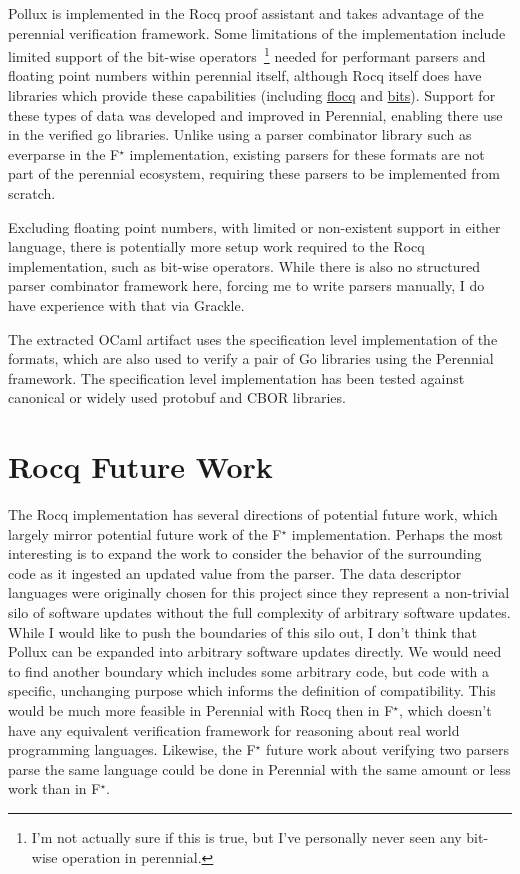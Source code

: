 \documentclass[11pt]{article}
\newcommand{\fstar}{F$^\star$}
\begin{document}
Pollux is implemented in the Rocq proof assistant and takes advantage of the
perennial verification framework. Some limitations of the implementation include
limited support of the bit-wise operators~\footnote{I'm not actually sure if
  this is true, but I've personally never seen any bit-wise operation in
  perennial.} needed for performant parsers and floating point numbers within
perennial itself, although Rocq itself does have libraries which provide these
capabilities (including \href{https://gitlab.inria.fr/flocq/flocq/}{flocq} and
\href{https://github.com/rocq-community/bits}{bits}). Support for these types of
data was developed and improved in Perennial, enabling there use in the verified
go libraries. Unlike using a parser combinator library such as everparse in the
\fstar{} implementation, existing parsers for these formats are not part of the
perennial ecosystem, requiring these parsers to be implemented from scratch. 

\begin{risk}
  Excluding floating point numbers, with limited or non-existent support in
  either language, there is potentially more setup work required to the Rocq
  implementation, such as bit-wise operators. While there is also no structured
  parser combinator framework here, forcing me to write parsers manually, I do
  have experience with that via Grackle.
\end{risk}

The extracted OCaml artifact uses the specification level implementation of the
formats, which are also used to verify a pair of Go libraries using the
Perennial framework. The specification level implementation has been tested
against canonical or widely used protobuf and CBOR libraries.

\section{Rocq Future Work}

The Rocq implementation has several directions of potential future work, which
largely mirror potential future work of the \fstar{} implementation. Perhaps the
most interesting is to expand the work to consider the behavior of the
surrounding code as it ingested an updated value from the parser. The data
descriptor languages were originally chosen for this project since they
represent a non-trivial silo of software updates without the full complexity of
arbitrary software updates. While I would like to push the boundaries of this
silo out, I don't think that Pollux can be expanded into arbitrary software
updates directly. We would need to find another boundary which includes some
arbitrary code, but code with a specific, unchanging purpose which informs the
definition of compatibility. This would be much more feasible in Perennial with
Rocq then in \fstar{}, which doesn't have any equivalent verification framework
for reasoning about real world programming languages. Likewise, the \fstar{}
future work about verifying two parsers parse the same language could be done in
Perennial with the same amount or less work than in \fstar{}.
\end{document}
